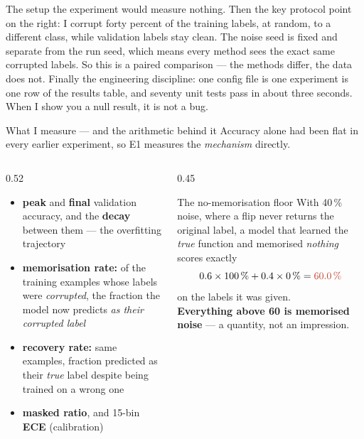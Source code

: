 \begin{frame}{The setup}
{    the experiment would measure nothing. Then the key protocol point on the
    right: I corrupt forty percent of the training labels, at random, to a
    different class, while validation labels stay clean. The noise seed is fixed
    and separate from the run seed, which means every method sees the exact same
    corrupted labels. So this is a paired comparison --- the methods differ, the
    data does not. Finally the engineering discipline: one config file is one
    experiment is one row of the results table, and seventy unit tests pass in
    about three seconds. When I show you a null result, it is not a bug.%
  }
\end{frame}

\begin{frame}{What I measure --- and the arithmetic behind it}
  \small
  Accuracy alone had been flat in every earlier experiment, so E1 measures the
  \emph{mechanism} directly.
  \begin{columns}[T]
    \begin{column}{0.52\textwidth}
      \begin{itemize}\setlength\itemsep{0.25em}
        \item \textbf{peak} and \textbf{final} validation accuracy, and the
              \textbf{decay} between them --- the overfitting trajectory
        \item \textbf{memorisation rate:} of the training examples whose labels
              were \emph{corrupted}, the fraction the model now predicts
              \emph{as their corrupted label}
        \item \textbf{recovery rate:} same examples, fraction predicted as their
              \emph{true} label despite being trained on a wrong one
        \item \textbf{masked ratio}, and 15-bin \textbf{ECE} (calibration)
      \end{itemize}
    \end{column}
    \begin{column}{0.45\textwidth}
      \begin{block}{The no-memorisation floor}
        With 40\,\% noise, where a flip never returns the original label, a model
        that learned the \emph{true} function and memorised \emph{nothing}
        scores exactly
        \[ 0.6 \times 100\,\% + 0.4 \times 0\,\% = \mhit{60.0\,\%} \]
        on the labels it was given.\\[0.3em]
        \textbf{Everything above 60 is memorised noise} --- a quantity, not an
        impression.

\end{block}
\end{column}
\end{columns}
\end{frame}
